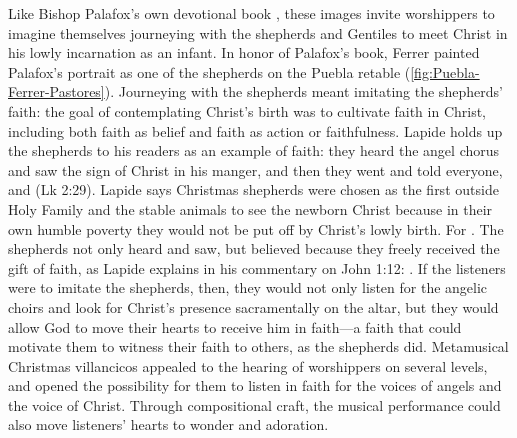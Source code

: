 Like Bishop Palafox's own devotional book ,
these images invite worshippers to imagine themselves journeying with the
shepherds and Gentiles to meet Christ in his lowly incarnation as an infant.%
    \Autocite{Palafox:Nochebuena}
In honor of Palafox's book, Ferrer painted Palafox's portrait as one of the
shepherds on the Puebla retable (\cref{fig:Puebla-Ferrer-Pastores}).%
    \Autocite[188--189]{Merlo:PueblaCat}
Journeying with the shepherds meant imitating the shepherds' faith: the goal of
contemplating Christ's birth was to cultivate faith in Christ, including both
faith as belief and faith as action or faithfulness.
Lapide holds up the shepherds to his readers as an example of faith: they heard
the angel chorus and saw the sign of Christ in his manger, and then they went
and told everyone, and  (Lk 2:29).
Lapide says Christmas shepherds were chosen as the first outside Holy Family and
the stable animals to see the newborn Christ because in their own humble poverty
they would not be put off by Christ's lowly birth.
For .%
    \Autocite
    [677, on Lk 2: .]
    {Lapide:Gospels19C}
The shepherds not only heard and saw, but believed because they freely received
the gift of faith, as Lapide explains in his commentary on John 1:12:
.%
    \Autocite
    [882: .
    Lapide seems to have a polemical eye here on his Calvinist compatriots in
    the Low Countries.]
    {Lapide:Gospels19C}
If the listeners were to imitate the shepherds, then, they would not only listen
for the angelic choirs and look for Christ's presence sacramentally on the
altar, but they would allow God to move their hearts to receive him in faith---a
faith that could motivate them to witness their faith to others, as the
shepherds did.
Metamusical Christmas villancicos appealed to the hearing of worshippers on
several levels, and opened the possibility for them to listen in faith for the
voices of angels and the voice of Christ.
Through compositional craft, the musical performance could also move listeners'
hearts to wonder and adoration.

